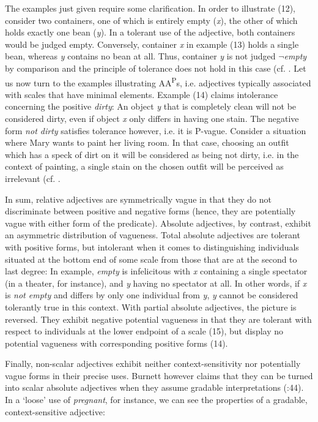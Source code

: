 \documentclass[output=paper
,modfonts
,nonflat]{langsci/langscibook}
\begin{document}
The examples just given require some clarification. In order to illustrate (12), consider two containers, one of which is entirely empty (\textit{x}), the other of which holds exactly one bean (\textit{y}). In a tolerant use of the adjective, both containers would be judged empty. Conversely, container \textit{x} in example (13) holds a single bean, whereas \textit{y} contains no bean at all. Thus, container \textit{y} is not judged $\neg$\textit{empty} by comparison and the principle of tolerance does not hold in this case (cf. \textcite[51]{Burnett2017}. Let us now turn to the examples illustrating AA\textsuperscript{P}s, i.e. adjectives typically associated with scales that have minimal elements. Example (14) claims intolerance concerning the positive \textit{dirty}: An object \textit{y} that is completely clean will not be considered dirty, even if object \textit{x} only differs in having one stain. The negative form \textit{not dirty} satisfies tolerance however, i.e. it is P-vague. Consider a situation where Mary wants to paint her living room. In that case, choosing an outfit which has a speck of dirt on it will be considered as being not dirty, i.e. in the context of painting, a single stain on the chosen outfit will be perceived as irrelevant (cf. \textcite[52]{Burnett2017}.

In sum, relative adjectives are symmetrically vague in that they do not discriminate between positive and negative forms (hence, they are potentially vague with either form of the predicate). Absolute adjectives, by contrast, exhibit an asymmetric distribution of vagueness. Total absolute adjectives are tolerant with positive forms, but intolerant when it comes to distinguishing individuals situated at the bottom end of some scale from those that are at the second to last degree: In \textcite[52]{Burnett2017} example, \textit{empty} is infelicitous with \textit{x} containing a single spectator (in a theater, for instance), and \textit{y} having no spectator at all. In other words, if \textit{x} is \textit{not empty} and differs by only one individual from \textit{y}, \textit{y} cannot be considered tolerantly true in this context.
With partial absolute adjectives, the picture is reversed. They exhibit negative potential vagueness in that they are tolerant with respect to individuals at the lower endpoint of a scale (15), but display no potential vagueness with corresponding positive forms (14).

Finally, non-scalar adjectives exhibit neither context-sensitivity \linebreak nor potentially vague forms in their precise uses. Burnett however claims that they can be turned into scalar absolute adjectives when they assume gradable interpretations (\citeyear{Burnett2017}:44). In a `loose' use of \textit{pregnant}, for instance, we can see the properties of a gradable, context-sensitive adjective: 
\end{document}
